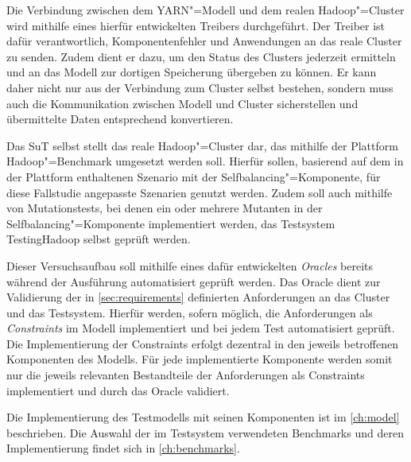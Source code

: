 Die Verbindung zwischen dem YARN"=Modell und dem realen Hadoop"=Cluster wird mithilfe eines hierfür entwickelten Treibers durchgeführt.
Der Treiber ist dafür verantwortlich, Komponentenfehler und Anwendungen an das reale Cluster zu senden.
Zudem dient er dazu, um den Status des Clusters jederzeit ermitteln und an das Modell zur dortigen Speicherung übergeben zu können.
Er kann daher nicht nur aus der Verbindung zum Cluster selbst bestehen, sondern muss auch die Kommunikation zwischen Modell und Cluster sicherstellen und übermittelte Daten entsprechend konvertieren.

Das \gls{SuT} selbst stellt das reale Hadoop"=Cluster dar, das mithilfe der Plattform Hadoop"=Benchmark umgesetzt werden soll.
Hierfür sollen, basierend auf dem in der Plattform enthaltenen Szenario mit der Selfbalancing"=Komponente, für diese Fallstudie angepasste Szenarien genutzt werden.
Zudem soll auch mithilfe von Mutationstests, bei denen ein oder mehrere Mutanten in der Selfbalancing"=Komponente implementiert werden, das Testsystem TestingHadoop selbst geprüft werden.

Dieser Versuchsaufbau soll mithilfe eines dafür entwickelten \emph{Oracles} bereits während der Ausführung automatisiert geprüft werden.
Das Oracle dient zur Validierung der in \cref{sec:requirements} definierten Anforderungen an das Cluster und das Testsystem.
Hierfür werden, sofern möglich, die Anforderungen als \emph{Constraints} im Modell implementiert und bei jedem Test automatisiert geprüft.
Die Implementierung der Constraints erfolgt dezentral in den jeweils betroffenen Komponenten des Modells.
Für jede implementierte Komponente werden somit nur die jeweils relevanten Bestandteile der Anforderungen als Constraints implementiert und durch das Oracle validiert.

Die Implementierung des Testmodells mit seinen Komponenten ist im \cref{ch:model} beschrieben.
Die Auswahl der im Testsystem verwendeten Benchmarks und deren Implementierung findet sich in \cref{ch:benchmarks}.
